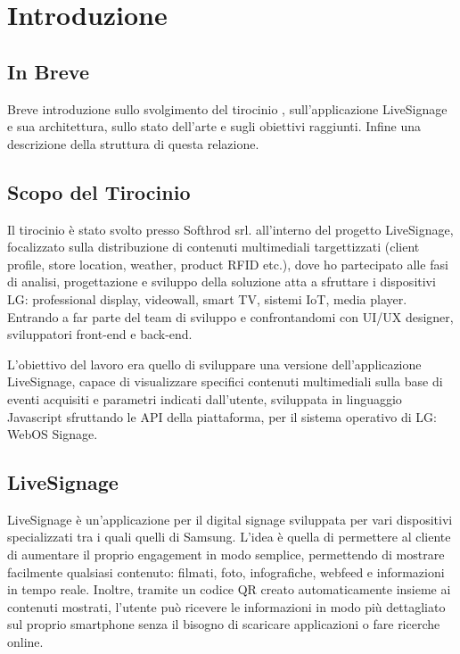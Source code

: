 \chapter{Introduzione}
\linespread{1.5}

\section{In Breve}
Breve introduzione sullo  svolgimento del tirocinio , sull'applicazione LiveSignage e sua architettura, sullo stato dell'arte e sugli obiettivi raggiunti. Infine una descrizione della struttura di questa relazione.

\section{Scopo del Tirocinio}

Il tirocinio è stato svolto presso Softhrod srl. all'interno del progetto LiveSignage, focalizzato sulla distribuzione di contenuti multimediali targettizzati (client profile, store location, weather, product RFID etc.), dove ho partecipato alle fasi di analisi, progettazione e sviluppo della soluzione atta a sfruttare i dispositivi LG: professional display, videowall, smart TV, sistemi IoT, media player. Entrando a far parte del team di sviluppo e confrontandomi con UI/UX designer, sviluppatori front-end e back-end.

L'obiettivo del lavoro era quello di sviluppare una versione dell'applicazione LiveSignage, capace di visualizzare specifici contenuti multimediali sulla base di eventi acquisiti e parametri indicati dall'utente, sviluppata in linguaggio Javascript sfruttando le API  della piattaforma, per il sistema operativo di LG: WebOS Signage.

\section{LiveSignage}

LiveSignage è un’applicazione per il digital signage sviluppata per vari dispositivi specializzati tra i quali quelli di Samsung. L’idea è quella di permettere al cliente di aumentare il proprio engagement in modo semplice, permettendo di mostrare facilmente qualsiasi contenuto: filmati, foto, infografiche, webfeed e informazioni in tempo reale.
Inoltre, tramite un codice QR creato automaticamente insieme ai contenuti mostrati, l'utente può ricevere le informazioni in modo più dettagliato sul proprio smartphone senza il bisogno di scaricare applicazioni o fare ricerche online.

